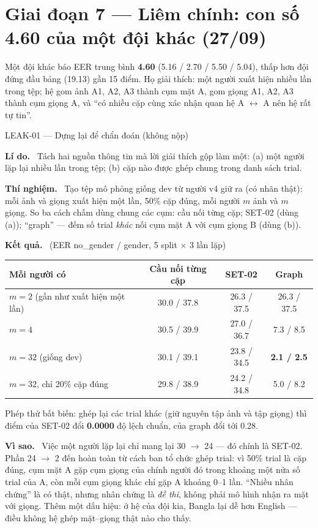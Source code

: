 \documentclass[11pt,a4paper,oneside]{report}
\newcommand{\field}[1]{\par\smallskip\textbf{\color{accent}#1.}~}
\begin{document}
\section{Giai đoạn 7 --- Liêm chính: con số 4.60 của một đội khác (27/09)}
\label{sec:p7}

Một đội khác báo EER trung bình \textbf{4.60} (5.16 / 2.70 / 5.50 / 5.04), thấp hơn đội đứng đầu bảng (19.13) gần 15 điểm. Họ giải thích: một người xuất hiện nhiều lần trong tệp; hệ gom ảnh A1, A2, A3 thành cụm mặt A, gom giọng A1, A2, A3 thành cụm giọng A, và ``có nhiều cặp cùng xác nhận quan hệ A $\leftrightarrow$ A nên hệ rất tự tin''.

\begin{expbox}{LEAK-01 --- Dựng lại để chẩn đoán (không nộp)}
\field{Lí do} Tách hai nguồn thông tin mà lời giải thích gộp làm một: (a) một người lặp lại nhiều lần trong tệp; (b) cặp nào được ghép chung trong danh sách trial.
\field{Thí nghiệm} Tạo tệp mô phỏng giống dev từ người v4 giữ ra (có nhãn thật): mỗi ảnh và giọng xuất hiện một lần, 50\% cặp đúng, mỗi người $m$ ảnh và $m$ giọng. So ba cách chấm dùng chung các cụm: cầu nối từng cặp; SET-02 (dùng (a)); ``graph'' --- đếm số trial \emph{khác} nối cụm mặt A với cụm giọng B (dùng (b)).
\field{Kết quả} (EER no\_gender / gender, 5 split $\times$ 3 lần lặp)

\smallskip
{\centering\small
\begin{tabular}{lccc}
\toprule
Mỗi người có & Cầu nối từng cặp & SET-02 & Graph \\
\midrule
$m=2$ (gần như xuất hiện một lần) & 30.0 / 37.8 & 26.3 / 37.5 & 26.3 / 37.5 \\
$m=4$ & 30.5 / 39.9 & 27.0 / 36.7 & 7.3 / 8.5 \\
$m=32$ (giống dev) & 30.1 / 39.1 & 23.8 / 34.5 & \textbf{2.1 / 2.5} \\
$m=32$, chỉ 20\% cặp đúng & 29.8 / 38.9 & 24.2 / 34.8 & 5.0 / 8.2 \\
\bottomrule
\end{tabular}
\par}
\smallskip
Phép thử bất biến: ghép lại các trial khác (giữ nguyên tập ảnh và tập giọng) thì điểm của SET-02 đổi \textbf{0.0000} độ lệch chuẩn, của graph đổi tới 0.28.
\field{Vì sao} Việc một người lặp lại chỉ mang lại 30 $\to$ 24 --- đó chính là SET-02. Phần 24 $\to$ 2 đến hoàn toàn từ cách ban tổ chức ghép trial: vì 50\% trial là cặp đúng, cụm mặt A gặp cụm giọng của chính người đó trong khoảng một nửa số trial của A, còn mỗi cụm giọng khác chỉ gặp A khoảng 0--1 lần. ``Nhiều nhân chứng'' là có thật, nhưng nhân chứng là \emph{đề thi}, không phải mô hình nhận ra mặt với giọng. Thêm một dấu hiệu: ở hệ của đội kia, Bangla lại dễ hơn English --- điều không hệ ghép mặt--giọng thật nào cho thấy.
\end{expbox}
\end{document}
